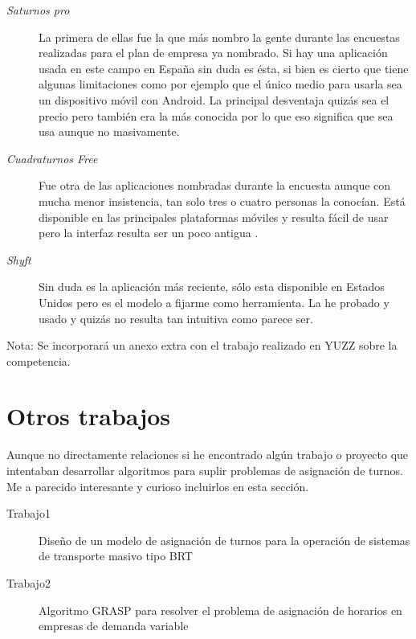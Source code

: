 \begin{description}
	\item[\emph{Saturnos pro}] La primera de ellas fue la que más nombro la gente durante las encuestas realizadas para el plan de empresa ya nombrado. Si hay una aplicación usada en este campo en España sin duda es ésta, si bien es cierto que tiene algunas limitaciones como por ejemplo que el único medio para usarla sea un dispositivo móvil con Android. La principal desventaja quizás sea el precio pero también era la más conocida por lo que eso significa que sea usa aunque no masivamente.
	\item[\emph{Cuadraturnos Free}] Fue otra de las aplicaciones nombradas durante la encuesta aunque con mucha menor insistencia, tan solo tres o cuatro personas la conocían. Está disponible en las principales plataformas móviles y resulta fácil de usar pero la interfaz resulta ser un poco antigua .
	\item[\emph{Shyft}] Sin duda es la aplicación más reciente, sólo esta disponible en Estados Unidos pero es el modelo a fijarme como herramienta. La he probado y usado y quizás no resulta tan intuitiva como parece ser.
\end{description}

Nota: Se incorporará un anexo extra con el trabajo realizado en YUZZ sobre la competencia. 

\section{Otros trabajos}
Aunque no directamente relaciones si he encontrado algún trabajo o proyecto que intentaban desarrollar algoritmos para suplir problemas de asignación de turnos. Me a parecido interesante y curioso incluirlos en esta sección.

    \begin{description}
	\item[Trabajo1] Diseño de un modelo de asignación de turnos para la operación
de sistemas de transporte masivo tipo BRT\cite{trabajo1}
	\item[Trabajo2]Algoritmo GRASP \citep{grasp} para resolver el problema de asignación de horarios en empresas de demanda variable \citep{trabajo2}
\end{description}

